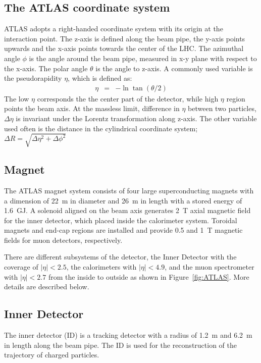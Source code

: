 \subsection{The ATLAS coordinate system}
ATLAS adopts a right-handed coordinate system with its origin at the interaction point. The z-axis is defined along the beam pipe, the y-axis points upwards and the x-axis points towards the center of the LHC. The azimuthal angle $\phi$ is the angle around the beam pipe, measured in x-y plane with respect to the x-axis. The polar angle $\theta$ is the angle to z-axis. A commonly used variable is the pseudorapidity $\eta$, which is defined as:
\begin{eqnarray*}
\eta &=& -\ln\tan(\theta/2)
\end{eqnarray*}
The low $\eta$ corresponds the the center part of the detector, while high $\eta$ region points the beam axis. At the massless limit, difference in $\eta$ between two particles, $\Delta\eta$ is invariant under the Lorentz transformation along z-axis.
The other variable used often is the distance in the cylindrical coordinate system;
$
\Delta R = \sqrt{\Delta \eta^2 + \Delta \phi^2}
$

\subsection{Magnet}
The ATLAS magnet system consists of four large superconducting magnets with a dimension of 22~m in diameter and 26~m in length with a stored energy of 1.6~GJ. A solenoid aligned on the beam axis generates 2~T axial magnetic field for the inner detector, which placed inside the calorimeter system. 
Toroidal magnets and end-cap regions are installed and provide 0.5 and 1~T magnetic fields for muon detectors, respectively.

There are different subsystems of the detector, the Inner Detector with the coverage of $| \eta | < 2.5$, the calorimeters with $| \eta | < 4.9$, and  the muon spectrometer with $| \eta | < 2.7$ from the inside to outside as shown in Figure~\ref{fig:ATLAS}. 
More details are described below.

\subsection{Inner Detector}
The inner detector (ID) is a tracking detector with a radius of 1.2~m and 6.2~m in length along the beam pipe. 
The ID is used for the reconstruction of the trajectory of charged particles. 

